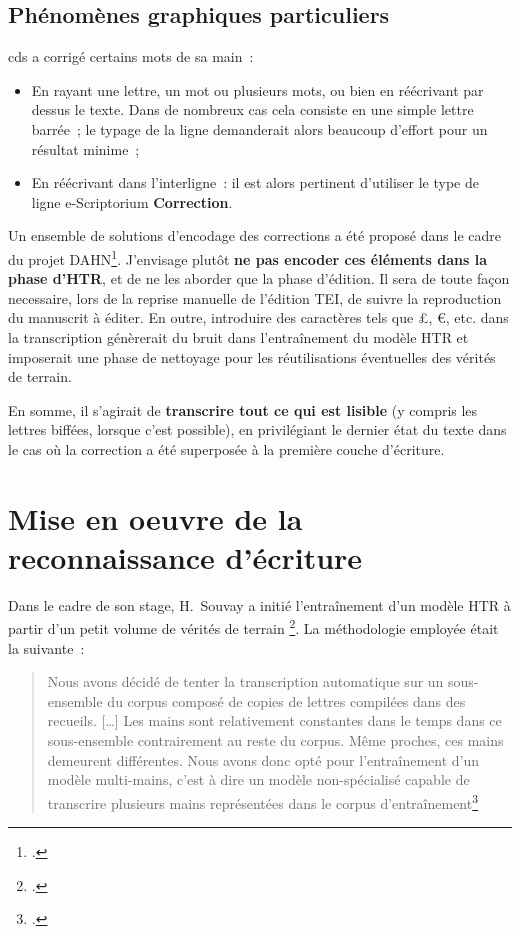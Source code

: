 \documentclass[a4paper,12pt,twoside]{book}
\begin{document}
	        \subsection{Phénomènes graphiques particuliers}
            \gls{cds} a corrigé certains mots de sa main~:
 
				\begin{itemize}
				 	\item En rayant une lettre, un mot ou plusieurs mots, ou bien en réécrivant par dessus le texte. Dans de nombreux cas cela consiste en une simple lettre barrée~; le typage de la ligne demanderait alors beaucoup d'effort pour un résultat minime~;
				 	\item En réécrivant dans l'interligne~: il est alors pertinent d'utiliser le type de ligne e-Scriptorium \textbf{Correction}.
				\end{itemize}
			
			Un ensemble de solutions d'encodage des corrections a été proposé dans le cadre du projet DAHN\footcite{chiffoleauFewTipsReading}. J'envisage plutôt \textbf{ne pas encoder ces éléments dans la phase d'HTR}, et de ne les aborder que la phase d'édition. Il sera de toute façon necessaire, lors de la reprise manuelle de l'édition TEI, de suivre la reproduction du manuscrit à éditer. En outre, introduire des caractères tels que £, €, etc. dans la transcription génèrerait du bruit dans l'entraînement du modèle HTR et imposerait une phase de nettoyage pour les réutilisations éventuelles des vérités de terrain.
			
			En somme, il s'agirait de \textbf{transcrire tout ce qui est lisible} (y compris les lettres biffées, lorsque c'est possible), en privilégiant le dernier état du texte dans le cas où la correction a été superposée à la première couche d'écriture.
			
		\section{Mise en oeuvre de la reconnaissance d'écriture}
			Dans le cadre de son stage, H.~Souvay a initié l'entraînement d'un modèle HTR à partir d'un petit volume de vérités de terrain \footcite{souvayCorrespondanceConstanceSalm2021}. La méthodologie employée était la suivante~:
			\begin{quotation}
				Nous avons décidé de tenter la transcription automatique sur un sous-ensemble du corpus composé de copies de lettres compilées dans des recueils. […] Les mains sont relativement constantes dans le temps dans ce sous-ensemble contrairement au reste du corpus. Même proches, ces mains demeurent différentes. Nous avons donc opté pour l’entraînement d’un modèle multi-mains, c’est à dire un modèle non-spécialisé capable de transcrire plusieurs mains représentées dans le corpus d’entraînement\footcite[p.~6-7]{souvayCorrespondanceConstanceSalm2021}
			\end{quotation}
\end{document}
